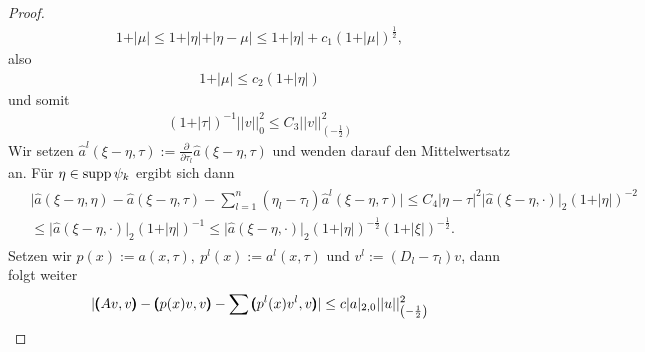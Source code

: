 \begin{thm}
\begin{proof}
\begin{align}
	1+\vert\mu\vert \le 1+\vert \eta\vert+\vert \eta-\mu\vert \le 1+\vert\eta\vert+c_1(1+\vert  \mu \vert)^{\frac{1}{2}},
\end{align}
also
\begin{align}
	1+\vert \mu\vert \le c_2\left(1+\vert\eta\vert\right)
\end{align}
und somit
\begin{align}
	\left(1+\vert\tau\vert\right)^{-1}\vert\vert v\vert\vert_0^2 \le C_3\vert\vert v\vert\vert_{\left(-\frac{1}{2}\right)}^2
\end{align}
Wir setzen $\widehat{a}^l(\xi-\eta,\tau):=\frac{\partial}{\partial \tau_l}\widehat{a}(\xi-\eta,\tau)$ und wenden darauf den Mittelwertsatz an. Für $\eta\in \operatorname{supp} \psi_k$ ergibt sich dann
\begin{align}
\begin{split}	&\vert \widehat{a}(\xi-\eta,\eta)-\widehat{a}(\xi-\eta,\tau) -\sum\limits_{l=1}^n (\eta_l-\tau_l)\widehat{a}^l\left(\xi-\eta,\tau\right)\vert \le C_4\vert \eta-\tau\vert^2\vert \widehat{a}(\xi-\eta,\cdot)\vert_2\left(1+\vert\eta\vert\right)^{-2} \\&
\le \vert \widehat{a}(\xi-\eta,\cdot)\vert_2 \left(1+\vert\eta\vert\right)^{-1} \le\vert \widehat{a}(\xi-\eta,\cdot)\vert_2\left(1+\vert\eta\vert\right)^{-\frac{1}{2}}\left(1+\vert\xi\vert\right)^{-\frac{1}{2}}.
\end{split}
\end{align}
Setzen wir $p(x):=a(x,\tau),\ p^l(x):= a^l(x,\tau) $ und $v^l:=(D_l-\tau_l)v$, dann folgt weiter
\begin{align}
	\vert\pmb(Av,v\pmb)-\pmb(p(x)v,v\pmb)-\sum\pmb(p^l(x)v^l,v\pmb)\vert \le c \vert a\vert_{2,0}\vert\vert u\vert\vert_{\left(-\frac{1}{2}\right)}^2
\end{align}
\end{proof}


\end{thm}


